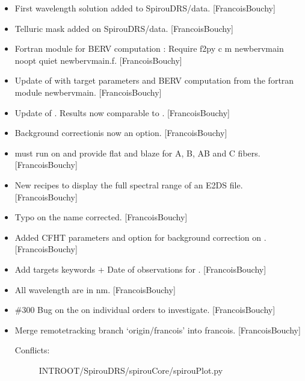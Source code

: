 \documentclass[a4paper,10pt,english]{report}
\begin{document}
\begin{itemize}
\begin{description}
\end{description}

\item {} 
First wavelength solution added to SpirouDRS/data. {[}FrancoisBouchy{]}

\item {} 
Telluric mask added on SpirouDRS/data. {[}FrancoisBouchy{]}

\item {} 
Fortran module for BERV computation : Require f2py \sphinxhyphen{}c \sphinxhyphen{}m newbervmain
\textendash{}noopt \textendash{}quiet newbervmain.f. {[}FrancoisBouchy{]}

\item {} 
Update of  with target parameters and BERV computation
from the fortran module newbervmain. {[}FrancoisBouchy{]}

\item {} 
Update of . Results now comparable to
. {[}FrancoisBouchy{]}

\item {} 
Background correctionis now an option. {[}FrancoisBouchy{]}

\item {} 
 must run on  and provide flat and blaze for
A, B, AB and C fibers. {[}FrancoisBouchy{]}

\item {} 
New recipes to display the full spectral range of an E2DS file.
{[}FrancoisBouchy{]}

\item {} 
Typo on the name corrected. {[}FrancoisBouchy{]}

\item {} 
Added CFHT parameters and option for background correction on
. {[}FrancoisBouchy{]}

\item {} 
Add targets keywords + Date of observations for .
{[}FrancoisBouchy{]}

\item {} 
All wavelength are in nm. {[}FrancoisBouchy{]}

\item {} 
\#300 Bug on the  on individual orders to investigate.
{[}FrancoisBouchy{]}

\item {} 
Merge remote\sphinxhyphen{}tracking branch ‘origin/francois’ into francois.
{[}FrancoisBouchy{]}
\begin{description}
\item[{Conflicts:}] \leavevmode
INTROOT/SpirouDRS/spirouCore/spirouPlot.py


\end{description}
\end{itemize}
\end{document}
